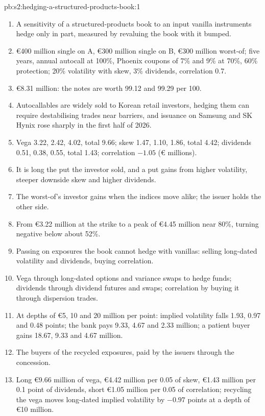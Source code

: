 \begin{solution}{pb:s2:hedging-a-structured-products-book:1}
\begin{enumerate}
\item A sensitivity of a structured-products book to an input vanilla instruments hedge only in part, measured by revaluing the book with it bumped.
\item \euro400 million single on A, \euro300 million single on B, \euro300 million worst-of; five years, annual autocall at 100\%, Phoenix coupons of 7\%
and 9\% at 70\%, 60\% protection; 20\% volatility with skew, 3\% dividends, correlation 0.7.
\item \euro8.31 million: the notes are worth 99.12 and 99.29 per 100.
\item Autocallables are widely sold to Korean retail investors, hedging them can require destabilising trades near barriers, and issuance on Samsung
and SK Hynix rose sharply in the first half of 2026.
\item Vega 3.22, 2.42, 4.02, total 9.66; skew 1.47, 1.10, 1.86, total 4.42; dividends 0.51, 0.38, 0.55, total 1.43; correlation $-1.05$ (\euro{}
millions).
\item It is long the put the investor sold, and a put gains from higher volatility, steeper downside skew and higher dividends.
\item The worst-of's investor gains when the indices move alike; the issuer holds the other side.
\item From \euro3.22 million at the strike to a peak of \euro4.45 million near 80\%, turning negative below about 52\%.
\item Passing on exposures the book cannot hedge with vanillas: selling long-dated volatility and dividends, buying correlation.
\item Vega through long-dated options and variance swaps to hedge funds; dividends through dividend futures and swaps; correlation by buying it
through dispersion trades.
\item At depths of \euro5, 10 and 20 million per point: implied volatility falls 1.93, 0.97 and 0.48 points; the bank pays 9.33, 4.67 and 2.33 million;
a patient buyer gains 18.67, 9.33 and 4.67 million.
\item The buyers of the recycled exposures, paid by the issuers through the concession.
\item Long \euro9.66 million of vega, \euro4.42 million per 0.05 of skew, \euro1.43 million per 0.1 point of dividends, short \euro1.05 million per 0.05 of
correlation; recycling the vega moves long-dated implied volatility by $-0.97$ points at a depth of \euro10 million.

\end{enumerate}
\end{solution}
